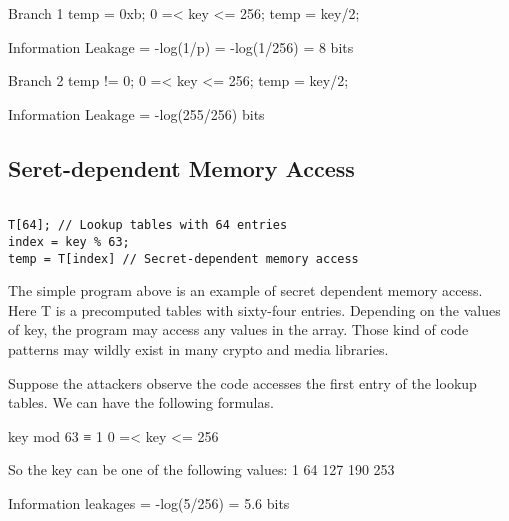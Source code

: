 Branch 1
temp = 0xb;
0 =< key <= 256;
temp = key/2;

Information Leakage = -log(1/p) = -log(1/256) = 8 bits

Branch 2
temp != 0; 
0 =< key <= 256;
temp = key/2;

Information Leakage = -log(255/256) bits

\subsection{Seret-dependent Memory Access}

\begin{lstlisting}

T[64]; // Lookup tables with 64 entries
index = key % 63;
temp = T[index] // Secret-dependent memory access       

\end{lstlisting}

The simple program above is an example of secret dependent memory access. Here T is a precomputed tables with sixty-four entries. Depending on the values of key, the program may access any values in the array. Those kind of code patterns may wildly exist in many crypto and media libraries. 

Suppose the attackers observe the code accesses the first entry of the lookup tables. We can have the following formulas.

key mod 63 ≡ 1
0 =< key <= 256

So the key can be one of the following values:
1 64 127 190 253

Information leakages = -log(5/256) =  5.6 bits

